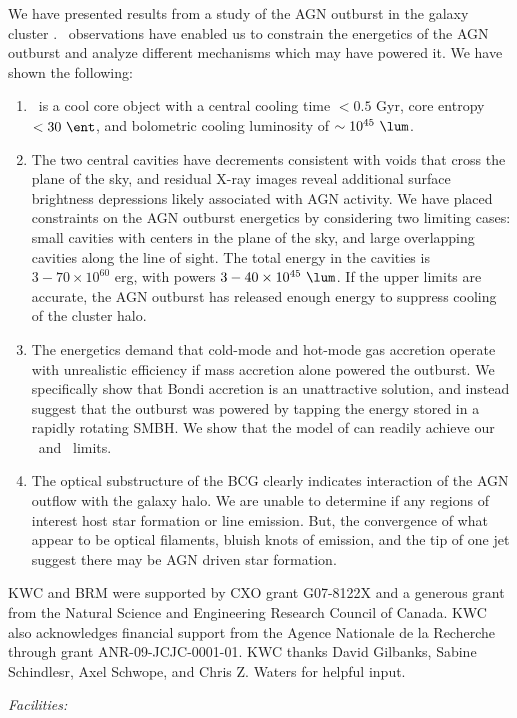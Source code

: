 \documentclass[iop]{emulateapj}
\begin{document}
We have presented results from a study of the AGN outburst in the
galaxy cluster \rbs. \cxo\ observations have enabled us to constrain
the energetics of the AGN outburst and analyze different mechanisms
which may have powered it. We have shown the following:
\begin{enumerate}
\item \rbs\ is a cool core object with a central cooling time $< 0.5$
  Gyr, core entropy $< 30 ~\ent$, and bolometric cooling luminosity of
  $\sim 10^{45} ~\lum$.
\item The two central cavities have decrements consistent with voids
  that cross the plane of the sky, and residual X-ray images reveal
  additional surface brightness depressions likely associated with AGN
  activity. We have placed constraints on the AGN outburst energetics
  by considering two limiting cases: small cavities with centers in
  the plane of the sky, and large overlapping cavities along the line
  of sight. The total energy in the cavities is $3-70 \times 10^{60}$
  erg, with powers $3-40 \times 10^{45} ~\lum$. If the upper limits
  are accurate, the AGN outburst has released enough energy to
  suppress cooling of the cluster halo.
\item The energetics demand that cold-mode and hot-mode gas accretion
  operate with unrealistic efficiency if mass accretion alone powered
  the outburst. We specifically show that Bondi accretion is an
  unattractive solution, and instead suggest that the outburst was
  powered by tapping the energy stored in a rapidly rotating SMBH. We
  show that the model of \citet{gesspin} can readily achieve our
  \ecav\ and \pcav\ limits.
\item The optical substructure of the BCG clearly indicates
  interaction of the AGN outflow with the galaxy halo. We are unable
  to determine if any regions of interest host star formation or line
  emission. But, the convergence of what appear to be optical
  filaments, bluish knots of emission, and the tip of one jet suggest
  there may be AGN driven star formation.
\end{enumerate}

\acknowledgements

KWC and BRM were supported by CXO grant G07-8122X and a generous grant
from the Natural Science and Engineering Research Council of
Canada. KWC also acknowledges financial support from the Agence
Nationale de la Recherche through grant ANR-09-JCJC-0001-01. KWC
thanks David Gilbanks, Sabine Schindlesr, Axel Schwope, and Chris
Z. Waters for helpful input.


{\it Facilities:}  
 





\clearpage





\end{document}
